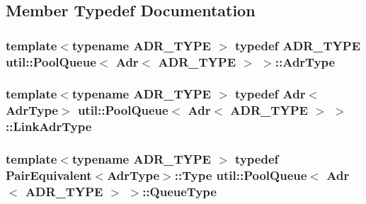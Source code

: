 \subsection{Member Typedef Documentation}
\hypertarget{structutil_1_1PoolQueue_3_01Adr_3_01ADR__TYPE_01_4_01_4_a38ac7f747c36631995a73845c63593b3}{
\subsubsection[{Adr\-Type}]{\setlength{\rightskip}{0pt plus 5cm}template$<$typename A\-D\-R\-\_\-\-T\-Y\-P\-E $>$ typedef A\-D\-R\-\_\-\-T\-Y\-P\-E {\bf util\-::\-Pool\-Queue}$<$ {\bf Adr}$<$ A\-D\-R\-\_\-\-T\-Y\-P\-E $>$ $>$\-::{\bf Adr\-Type}}}\label{structutil_1_1PoolQueue_3_01Adr_3_01ADR__TYPE_01_4_01_4_a38ac7f747c36631995a73845c63593b3}
\hypertarget{structutil_1_1PoolQueue_3_01Adr_3_01ADR__TYPE_01_4_01_4_a6a40a095e6f1bc5fabe6651ac01da837}{
\subsubsection[{Link\-Adr\-Type}]{\setlength{\rightskip}{0pt plus 5cm}template$<$typename A\-D\-R\-\_\-\-T\-Y\-P\-E $>$ typedef {\bf Adr}$<${\bf Adr\-Type}$>$ {\bf util\-::\-Pool\-Queue}$<$ {\bf Adr}$<$ A\-D\-R\-\_\-\-T\-Y\-P\-E $>$ $>$\-::{\bf Link\-Adr\-Type}}}\label{structutil_1_1PoolQueue_3_01Adr_3_01ADR__TYPE_01_4_01_4_a6a40a095e6f1bc5fabe6651ac01da837}
\hypertarget{structutil_1_1PoolQueue_3_01Adr_3_01ADR__TYPE_01_4_01_4_a4fcdebc8e6fe82133f13bd6eca5b3034}{
\subsubsection[{Queue\-Type}]{\setlength{\rightskip}{0pt plus 5cm}template$<$typename A\-D\-R\-\_\-\-T\-Y\-P\-E $>$ typedef {\bf Pair\-Equivalent}$<${\bf Adr\-Type}$>$\-::Type {\bf util\-::\-Pool\-Queue}$<$ {\bf Adr}$<$ A\-D\-R\-\_\-\-T\-Y\-P\-E $>$ $>$\-::{\bf Queue\-Type}}}\label{structutil_1_1PoolQueue_3_01Adr_3_01ADR__TYPE_01_4_01_4_a4fcdebc8e6fe82133f13bd6eca5b3034}
